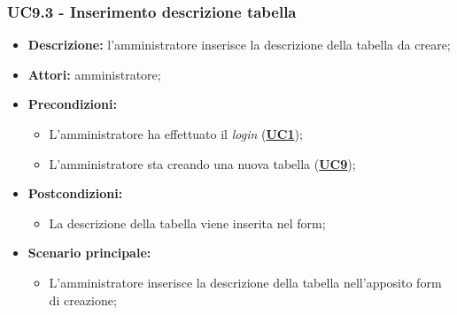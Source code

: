 \subsubsection{UC9.3 - Inserimento descrizione tabella}
\label{sec:UC9.3}
\begin{itemize}
	\item \textbf{Descrizione:} l’amministratore inserisce la descrizione della tabella da creare;
	\item \textbf{Attori:} amministratore;
	\item \textbf{Precondizioni:} 
	\begin{itemize}
		\item L’amministratore ha effettuato il \textit{login} (\hyperref[sec:UC1]{\textbf{UC1}});
		\item L’amministratore sta creando una nuova tabella (\hyperref[sec:UC9]{\textbf{UC9}});
	\end{itemize}
	\item \textbf{Postcondizioni:} 
	\begin{itemize}
		\item La descrizione della tabella viene inserita nel form;
	\end{itemize}
	\item \textbf{Scenario principale:} 
	\begin{itemize}
		\item L’amministratore inserisce la descrizione della tabella nell'apposito form di creazione;
	\end{itemize}
\end{itemize}

